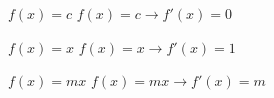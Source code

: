 \documentclass[avery5371,frame,ngerman]{flashcards}
\begin{document}
\begin{flashcard}{$f(x) = c$}
$f(x) = c \rightarrow f'(x) = 0$
\end{flashcard}

\begin{flashcard}{$f(x) = x$}
$f(x) = x \rightarrow f'(x) = 1$
\end{flashcard}

\begin{flashcard}{$f(x) = mx$}
$f(x) = mx \rightarrow f'(x) = m$
\end{flashcard}
\end{document}
